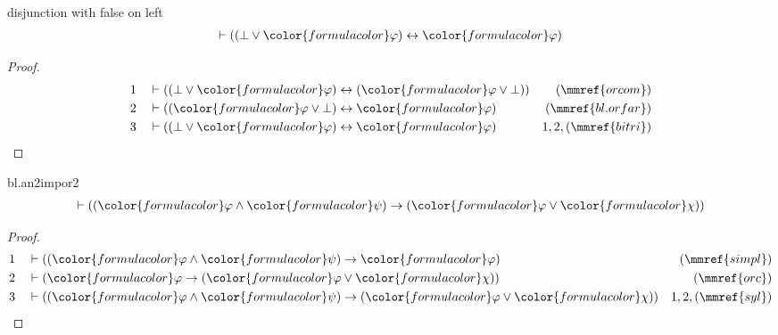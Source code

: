 \begin{lemma} disjunction with false  on left
\begin{align}
\vdash ( ( \bot \vee {\color{formulacolor}\varphi} ) \leftrightarrow
    {\color{formulacolor}\varphi} )\label{bl.orfal}
\end{align}
\end{lemma}

\begin{proof}
\begin{align}
  1 && & \vdash ( ( \bot \vee {\color{formulacolor}\varphi} ) \leftrightarrow (
      {\color{formulacolor}\varphi} \vee \bot )
      )&(\mmref{orcom})\notag
  \\ 2 && & \vdash ( ( {\color{formulacolor}\varphi} \vee \bot )
      \leftrightarrow {\color{formulacolor}\varphi}
      )&(\mmref{bl.orfar})\notag
  \\ 3 && & \vdash ( ( \bot \vee {\color{formulacolor}\varphi} )
      \leftrightarrow {\color{formulacolor}\varphi}
      )&1,2,(\mmref{bitri})\notag
\end{align}
\end{proof}

\begin{lemma} bl.an2impor2
\begin{align}
\vdash ( ( {\color{formulacolor}\varphi} \wedge {\color{formulacolor}\psi} )
    \rightarrow ( {\color{formulacolor}\varphi} \vee {\color{formulacolor}\chi}
    ) )\label{bl.an2impor2}
\end{align}
\end{lemma}

\begin{proof}
\begin{align}
  1 && & \vdash ( ( {\color{formulacolor}\varphi} \wedge
      {\color{formulacolor}\psi} ) \rightarrow
      {\color{formulacolor}\varphi}
      )&(\mmref{simpl})\notag
  \\ 2 && & \vdash ( {\color{formulacolor}\varphi} \rightarrow (
      {\color{formulacolor}\varphi} \vee
      {\color{formulacolor}\chi} ) )&(\mmref{orc})\notag
  \\ 3 && & \vdash ( ( {\color{formulacolor}\varphi} \wedge
      {\color{formulacolor}\psi} ) \rightarrow (
      {\color{formulacolor}\varphi} \vee
      {\color{formulacolor}\chi} )
      )&1,2,(\mmref{syl})\notag
\end{align}
\end{proof}

